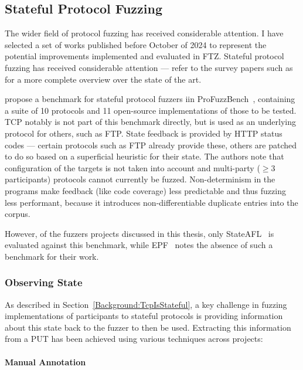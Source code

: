 \documentclass{article}
\newcommand{\proj}{FTZ\xspace}
\let\savedCite=\cite
\renewcommand{\cite}{\unskip~\savedCite}
\begin{document}
\begin{multicols}{2}
  \subsection{Stateful Protocol Fuzzing}

  The wider field of protocol fuzzing has received considerable attention. I have selected a set of works published before October of 2024 to represent the potential improvements implemented and evaluated in \proj. Stateful protocol fuzzing has received considerable attention — refer to the survey papers such as \cite{StatefulReview,Survey,IndustrialReview} for a more complete overview over the state of the art.

  \citeauthor{ProFuzzBench} propose a benchmark for stateful protocol fuzzers iin ProFuzzBench\cite{ProFuzzBench}, containing a suite of 10 protocols and 11 open-source implementations of those to be tested. TCP notably is not part of this benchmark directly, but is used as an underlying protocol for others, such as FTP. State feedback is provided by HTTP status codes — certain protocols such as FTP already provide these, others are patched to do so based on a superficial heuristic for their state. The authors note that configuration of the targets is not taken into account and multi-party ($\geq 3$ participants) protocols cannot currently be fuzzed. Non-determinism in the programs make feedback (like code coverage) less predictable and thus fuzzing less performant, because it introduces non-differentiable duplicate entries into the corpus.

  However, of the fuzzers projects discussed in this thesis, only StateAFL\cite{StateAFL} is evaluated against this benchmark, while EPF\cite{EPF} notes the absence of such a benchmark for their work.

  \subsubsection{Observing State}

  As described in Section~\ref{Background:TcpIsStateful}, a key challenge in fuzzing implementations of participants to stateful protocols is providing information about this state back to the fuzzer to then be used. Extracting this information from a PUT has been achieved using various techniques across projects:

  \paragraph{Manual Annotation}


\end{multicols}
\end{document}
